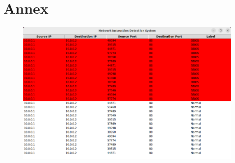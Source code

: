 \chapter*{Annex}
\begin{figure}[tbh]
	\begin{center}
		\includegraphics[width=5in]{images/annex.png}
	\end{center}
\end{figure}

